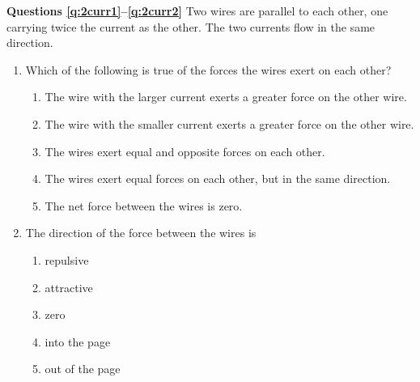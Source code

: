 \documentclass{../../../oss-classkick}
\begin{document}
\begin{multicols*}{2}
  \textbf{Questions \ref{q:2curr1}--\ref{q:2curr2}}
  Two wires are parallel to each other, one carrying twice the current as the
  other. The two currents flow in the same direction.

  \begin{enumerate}[leftmargin=18pt,resume]
  \item Which of the following is true of the forces the wires exert on each
    other?
    \begin{enumerate}[nosep,leftmargin=18pt,label=(\Alph*)]
    \item The wire with the larger current exerts a greater force on the other
      wire.
    \item The wire with the smaller current exerts a greater force on the other
      wire.
    \item The wires exert equal and opposite forces on each other.
    \item The wires exert equal forces on each other, but in the same direction.
    \item The net force between the wires is zero.
    \end{enumerate}
    \label{q:2curr1}
    \vspace{.7in}
    
  \item The direction of the force between the wires is
    \begin{enumerate}[nosep,leftmargin=18pt,label=(\Alph*)]
    \item repulsive
    \item attractive
    \item zero
    \item into the page
    \item out of the page
    \end{enumerate}
    \label{q:2curr2}
    \vspace{.7in}
    

\end{enumerate}
\end{multicols*}
\end{document}
